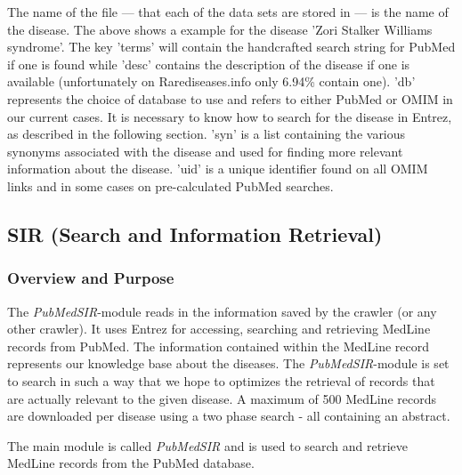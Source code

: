 The name of the file --- that each of the data sets are stored in ---
is the name of the disease. The above shows a example for the disease
'Zori Stalker Williams syndrome'. The key 'terms' will contain the
handcrafted search string for PubMed if one is found while 'desc'
contains the description of the disease if one is available
(unfortunately on Rarediseases.info only 6.94\% contain one). 'db'
represents the choice of database to use and refers to either PubMed
or OMIM in our current cases. It is necessary to know how to search for
the disease in Entrez, as described in the following section. 'syn' is
a list containing the various synonyms associated with the disease and
used for finding more relevant information about the disease. 'uid' is
a unique identifier found on all OMIM links and in some cases on
pre-calculated PubMed searches.

\subsection{SIR (Search and Information Retrieval)\label{SIR}}

\subsubsection{Overview and Purpose}
The \textit{PubMedSIR}-module reads in the information saved by the crawler (or any
other crawler). It uses Entrez for accessing, searching and retrieving
MedLine records from PubMed. The information contained within the
MedLine record represents our knowledge base about the diseases. The
\textit{PubMedSIR}-module is set to search in such a way that we hope to optimizes
the retrieval of records that are actually relevant to the given disease. A
maximum of 500 MedLine records are downloaded per disease using a two
phase search - all containing an abstract.

The main module is called \textit{PubMedSIR} and is used to search and
retrieve MedLine records from the PubMed database.

